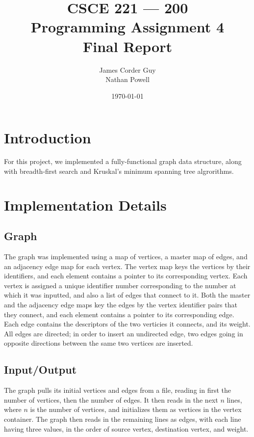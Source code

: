 \documentclass[titlepage]{article}
\title{
	\textbf{
		CSCE 221 --- 200 \\
		Programming Assignment 4 \\
		Final Report
	}
}
\author{
	James Corder Guy \\
	Nathan Powell
}
\date{
	\today
}
\begin{document}
	
	\maketitle
	\begin{multicols}{2}
		\section{Introduction}
            For this project, we implemented a fully-functional graph data structure, along with breadth-first search and Kruskal's minimum spanning tree algrorithms.
		\section{Implementation Details}
			\subsection{Graph}
                The graph was implemented using a map of vertices, a master map of edges, and an adjacency edge map for each vertex. The vertex map keys the vertices by their identifiers, and each element contains a pointer to its corresponding vertex. Each vertex is assigned a unique identifier number corresponding to the number at which it was inputted, and also a list of edges that connect to it. Both the master and the adjacency edge maps key the edges by the vertex identifier pairs that they connect, and each element contains a pointer to its corresponding edge. Each edge contains the descriptors of the two verticies it connects, and its weight. All edges are directed; in order to insert an undirected edge, two edges going in opposite directions between the same two vertices are inserted.
			\subsection{Input/Output}
                The graph pulls its initial vertices and edges from a file, reading in first the number of vertices, then the number of edges. It then reads in the next $n$ lines, where $n$ is the number of vertices, and initializes them as vertices in the vertex container. The graph then reads in the remaining lines as edges, with each line having three values, in the order of source vertex, destination vertex, and weight.

\end{multicols}
\end{document}
